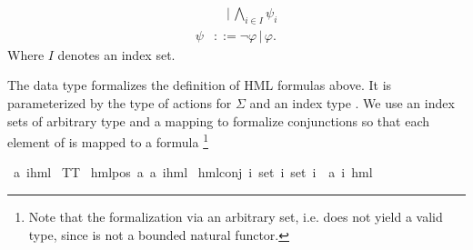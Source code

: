 \begin{isabellebody}
\begin{isamarkuptext}
\begin{align*}
            &\quad | \, \bigwedge_{i \in I} \psi_i \\
    \psi &::= \neg \varphi \, | \, \varphi.
\end{align*}
Where $I$ denotes an index set.%
\end{isamarkuptext}\isamarkuptrue%
%
\begin{isamarkuptext}%
The data type  formalizes the definition of HML formulas above. It is parameterized by the type of actions  for $\Sigma$
and an index type . We use an index sets of arbitrary type  and a mapping  to formalize
conjunctions so that each element of  is mapped to a formula%
\footnote{Note that the formalization via an arbitrary set, i.e.  does not yield a valid type, since  is not a bounded natural functor.}%
\end{isamarkuptext}\isamarkuptrue%
\isamarkupfalse%
\ {\isacharparenleft}{\kern0pt}{\isacharprime}{\kern0pt}a{\isacharcomma}{\kern0pt}\ {\isacharprime}{\kern0pt}i{\isacharparenright}{\kern0pt}hml\ {\isacharequal}{\kern0pt}\isanewline
TT\ {\isacharbar}{\kern0pt}\isanewline
hml{\isacharunderscore}{\kern0pt}pos\ {\isacartoucheopen}{\isacharprime}{\kern0pt}a{\isacartoucheclose}\ {\isacartoucheopen}{\isacharparenleft}{\kern0pt}{\isacharprime}{\kern0pt}a{\isacharcomma}{\kern0pt}\ {\isacharprime}{\kern0pt}i{\isacharparenright}{\kern0pt}hml{\isacartoucheclose}\ {\isacharbar}{\kern0pt}\isanewline
hml{\isacharunderscore}{\kern0pt}conj\ {\isacartoucheopen}{\isacharprime}{\kern0pt}i\ set{\isacartoucheclose}\ {\isacartoucheopen}{\isacharprime}{\kern0pt}i\ set{\isacartoucheclose}\ {\isacartoucheopen}{\isacharprime}{\kern0pt}i\ {\isasymRightarrow}\ {\isacharparenleft}{\kern0pt}{\isacharprime}{\kern0pt}a{\isacharcomma}{\kern0pt}\ {\isacharprime}{\kern0pt}i{\isacharparenright}{\kern0pt}\ hml{\isacartoucheclose}%
\begin{isamarkuptext}%

\end{isamarkuptext}
\end{isabellebody}
